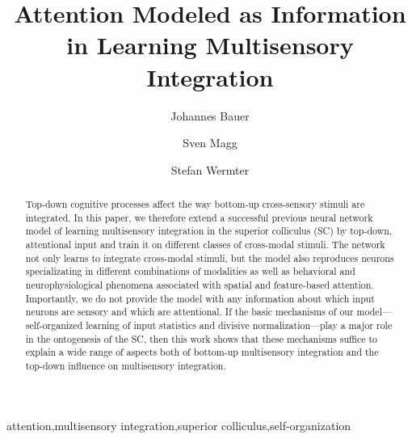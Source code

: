 \documentclass[a4paper]{elsarticle}
\title{Attention Modeled as Information in Learning Multisensory Integration}
\begin{document}
    \author[uhh]{Johannes Bauer}

    \author[uhh]{Sven Magg}

    \author[uhh]{Stefan Wermter}

    \address[uhh]{University of Hamburg\\ Department of Informatics\\ Knowledge Technology, WTM\\ Vogt-K\"olln-Stra\ss{}e 30\\ 22527 Hamburg\\ Germany}


    \begin{abstract}
        Top-down cognitive processes affect the way bottom-up cross-sensory stimuli are integrated.
        In this paper, we therefore extend a successful previous neural network model of learning multisensory integration in the superior colliculus (SC) by top-down, attentional input and train it on different classes of cross-modal stimuli.
        The network not only learns to integrate cross-modal stimuli, but the model also reproduces neurons specializating in different combinations of modalities as well as behavioral and neurophysiological phenomena associated with spatial and feature-based attention.
        Importantly, we do not provide the model with any information about which input neurons are sensory and which are attentional.
        If the basic mechanisms of our model---self-organized learning of input statistics and divisive normalization---play a major role in the ontogenesis of the SC, then this work shows that these mechanisms suffice to explain a wide range of aspects both of bottom-up multisensory integration and the top-down influence on multisensory integration.

    \end{abstract}

    \begin{keyword}
        attention\sep multisensory integration\sep superior colliculus\sep self-organization
    \end{keyword}

	\maketitle
\end{document}
